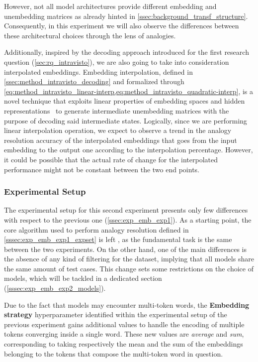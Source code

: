 However, not all model architectures provide different embedding and unembedding matrices as already hinted in \cref{ssec:background_transf_structure}.
Consequently, in this experiment we will also observe the differences between these architectural choices through the lens of analogies.

Additionally, inspired by the decoding approach introduced for the first research question (\cref{sec:rq_intravisto}), we are also going to take into consideration interpolated embeddings.
Embedding interpolation, defined in \cref{ssec:method_intravisto_decoding} and formalized through \cref{eq:method_intravisto_linear-interp,eq:method_intravisto_quadratic-interp}, is a novel technique that exploits linear properties of embedding spaces and hidden representations~\cite{park2023, mikolov2013, drozd2016} to generate intermediate unembedding matrices with the purpose of decoding said intermediate states.
Logically, since we are performing linear interpolation operation, we expect to observe a trend in the analogy resolution accuracy of the interpolated embeddings that goes from the input embedding to the output one according to the interpolation percentage.
However, it could be possible that the actual rate of change for the interpolated performance might not be constant between the two end points. 

\subsubsection{Experimental Setup}\label{sssec:exp_emb_exp2_expset}

The experimental setup for this second experiment presents only few differences with respect to the previous one (\cref{ssec:exp_emb_exp1}).
As a starting point, the core algorithm used to perform analogy resolution defined in \cref{sssec:exp_emb_exp1_expset} is left , as the fundamental task is the same between the two experiments.
On the other hand, one of the main differences is the absence of any kind of filtering for the dataset, implying that all models share the same amount of test cases.
This change  sets some restrictions on the choice of models, which will be tackled in a dedicated section (\cref{sssec:exp_emb_exp2_models}).

Due to the fact that models may encounter multi-token words, the \textbf{Embedding strategy} hyperparameter identified within the experimental setup of the previous experiment gains additional values to handle the encoding of multiple tokens converging inside a single word.
These new values are \textit{average} and \textit{sum}, corresponding to taking respectively the mean and the sum of the embeddings belonging to the tokens that compose the multi-token word in question.  

